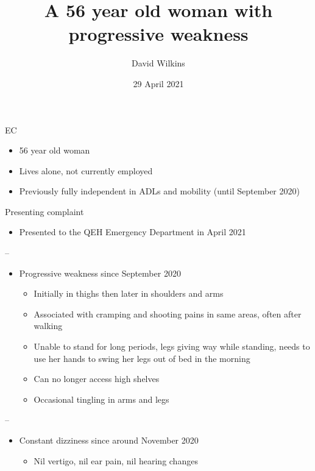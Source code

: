\documentclass[
  ignorenonframetext,
]{beamer}
\title{A 56 year old woman with progressive weakness}
\author{David Wilkins}
\date{29 April 2021}
\institute{Gen Med 008}
\providecommand{\tightlist}{%
  \setlength{\itemsep}{0pt}\setlength{\parskip}{0pt}}
\begin{document}
\frame{\titlepage}

\begin{frame}{EC}
\protect\hypertarget{ec}{}
\begin{itemize}
\tightlist
\item
  56 year old woman
\item
  Lives alone, not currently employed
\item
  Previously fully independent in ADLs and mobility (until September
  2020)
\end{itemize}
\end{frame}

\begin{frame}{Presenting complaint}
\protect\hypertarget{presenting-complaint}{}
\begin{itemize}
\tightlist
\item
  Presented to the QEH Emergency Department in April 2021
\end{itemize}

--

\begin{itemize}
\tightlist
\item
  Progressive weakness since September 2020

  \begin{itemize}
  \tightlist
  \item
    Initially in thighs then later in shoulders and arms
  \item
    Associated with cramping and shooting pains in same areas, often
    after walking
  \item
    Unable to stand for long periods, legs giving way while standing,
    needs to use her hands to swing her legs out of bed in the morning
  \item
    Can no longer access high shelves
  \item
    Occasional tingling in arms and legs
  \end{itemize}
\end{itemize}

--

\begin{itemize}
\tightlist
\item
  Constant dizziness since around November 2020

  \begin{itemize}
  \tightlist
  \item
    Nil vertigo, nil ear pain, nil hearing changes
  \end{itemize}
\end{itemize}


\end{frame}
\end{document}
